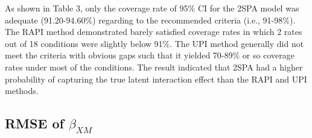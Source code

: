 \documentclass[
  man]{apa7}
\begin{document}
As shown in Table 3, only the coverage rate of 95\(\%\) CI for the 2SPA model was adequate (91.20-94.60\(\%\)) regarding to the recommended criteria (i.e., 91-98\(\%\)). The RAPI method demonstrated barely satisfied coverage rates in which 2 rates out of 18 conditions were slightly below 91\(\%\). The UPI method generally did not meet the criteria with obvious gaps such that it yielded 70-89\(\%\) or so coverage rates under most of the conditions. The result indicated that 2SPA had a higher probability of capturing the true latent interaction effect than the RAPI and UPI methods.

\hypertarget{rmse-of-beta_xm}{%
\subsection{\texorpdfstring{RMSE of \(\beta_{XM}\)}{RMSE of \textbackslash beta\_\{XM\}}}\label{rmse-of-beta_xm}}
\end{document}
